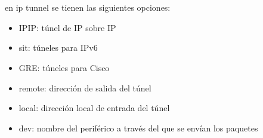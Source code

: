 \documentclass[10pt,a4paper,titlepage]{article}
\begin{document}
	\\
	\\
	en ip tunnel se tienen las siguientes opciones:

	\begin{itemize}
		\item IPIP: túnel de IP sobre IP
		\item sit: túneles para IPv6
		\item GRE: túneles para Cisco
	\end{itemize}

	\begin{itemize}
		\item remote: dirección de salida del túnel
		\item local: dirección local de entrada del túnel
		\item dev: nombre del periférico a través del que se envían los paquetes
	\end{itemize}
	
\end{document}
